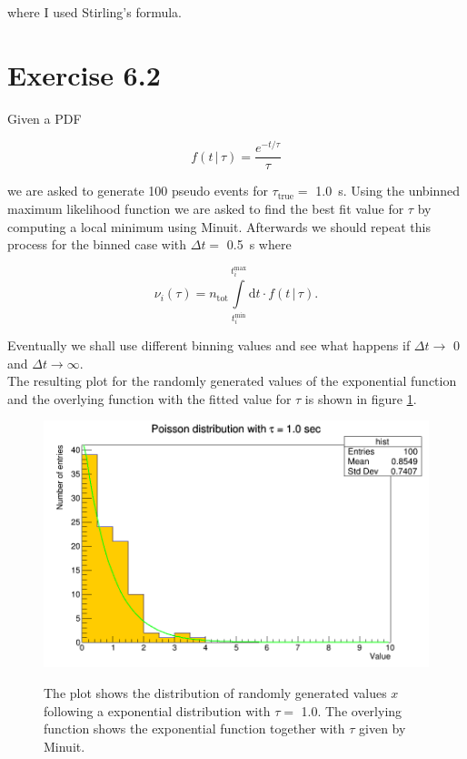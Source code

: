 \documentclass[10pt]{article}
\newenvironment{myfont}{\fontfamily{put}\selectfont}{\par}
\begin{document}
\begin{myfont}
\noindent where I used Stirling's formula.


\section*{Exercise 6.2}

\noindent Given a PDF 

\begin{equation}
f(t\, | \, \tau) = \frac{e^{-t/\tau}}{\tau}
\end{equation}

\noindent we are asked to generate \num{100} pseudo events for $\tau_{\textrm{true}} =$ \SI{1.0}{\second}.
Using the unbinned maximum likelihood function we are asked to find the best fit value for $\tau$ by computing a local minimum using Minuit.
Afterwards we should repeat this process for the binned case with $\Delta t =$ \SI{0.5}{\second} where

\begin{equation}
\nu_{i}(\tau) = n_{\textrm{tot}} \int\limits_{t_{i}^{\textrm{min}}}^{t_{i}^{\textrm{max}}} \textrm{d}t \cdot f(t\, | \, \tau).
\end{equation}

\noindent Eventually we shall use different binning values and see what happens if $\Delta t \rightarrow $ \num{0} and $\Delta t \rightarrow \infty$. \\

\noindent The resulting plot for the randomly generated values of the exponential function and the overlying function with the fitted value for $\tau$ is shown in figure \ref{fig:ex6_2}.

\begin{figure}[H]
	\centering
	\caption{The plot shows the distribution of randomly generated values $x$ following a exponential distribution with $\tau =$ \num{1.0}.
	The overlying function shows the exponential function together with $\tau$ given by Minuit.}
	\includegraphics[width = \textwidth]{exercise6_2.png}
	\label{fig:ex6_2}
\end{figure}


\end{myfont}
\end{document}
